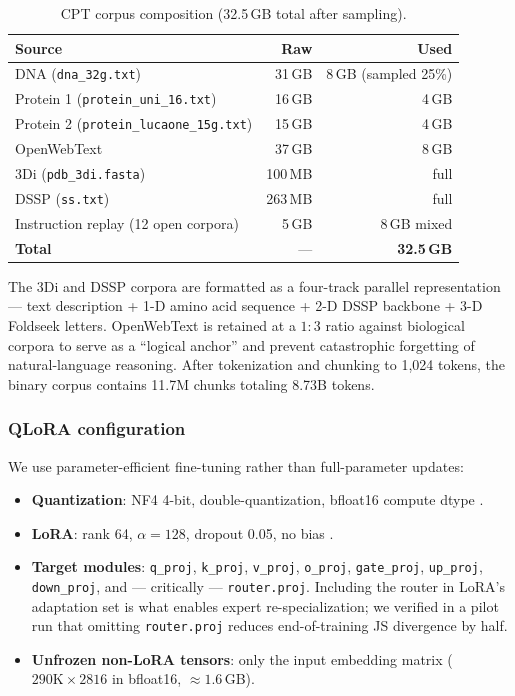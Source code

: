 \documentclass[11pt]{article}
\begin{document}
\begin{table}[H]
\centering
\small
\caption{CPT corpus composition (32.5\,GB total after sampling).}
\label{tab:cpt-data}
\begin{tabular}{lrr}
\toprule
\textbf{Source} & \textbf{Raw} & \textbf{Used} \\
\midrule
DNA (\texttt{dna\_32g.txt})                   & 31\,GB  & 8\,GB (sampled 25\%) \\
Protein 1 (\texttt{protein\_uni\_16.txt})      & 16\,GB  & 4\,GB \\
Protein 2 (\texttt{protein\_lucaone\_15g.txt}) & 15\,GB  & 4\,GB \\
OpenWebText                                    & 37\,GB  & 8\,GB \\
3Di (\texttt{pdb\_3di.fasta})                  & 100\,MB & full \\
DSSP (\texttt{ss.txt})                         & 263\,MB & full \\
Instruction replay (12 open corpora)           &  5\,GB  & 8\,GB mixed \\
\midrule
\textbf{Total}                                 & ---     & \textbf{32.5\,GB} \\
\bottomrule
\end{tabular}
\end{table}

The 3Di \citep{vankempen2024foldseek} and DSSP \citep{kabsch1983dssp} corpora are formatted as a four-track parallel representation --- text description + 1-D amino acid sequence + 2-D DSSP backbone + 3-D Foldseek letters. OpenWebText \citep{gadre2021pile} is retained at a $1:3$ ratio against biological corpora to serve as a ``logical anchor'' and prevent catastrophic forgetting of natural-language reasoning. After tokenization and chunking to 1{,}024 tokens, the binary corpus contains 11.7M chunks totaling 8.73B tokens.

\subsubsection{QLoRA configuration}

We use parameter-efficient fine-tuning rather than full-parameter updates:
\begin{itemize}\setlength\itemsep{0pt}
\item \textbf{Quantization}: NF4 4-bit, double-quantization, bfloat16 compute dtype \citep{dettmers2023qlora}.
\item \textbf{LoRA}: rank 64, $\alpha = 128$, dropout 0.05, no bias \citep{hu2022lora}.
\item \textbf{Target modules}: \texttt{q\_proj}, \texttt{k\_proj}, \texttt{v\_proj}, \texttt{o\_proj}, \texttt{gate\_proj}, \texttt{up\_proj}, \texttt{down\_proj}, and --- critically --- \texttt{router.proj}. Including the router in LoRA's adaptation set is what enables expert re-specialization; we verified in a pilot run that omitting \texttt{router.proj} reduces end-of-training JS divergence by half.
\item \textbf{Unfrozen non-LoRA tensors}: only the input embedding matrix ($290\text{K} \times 2816$ in bfloat16, $\approx 1.6$\,GB).
\end{itemize}
\end{document}
